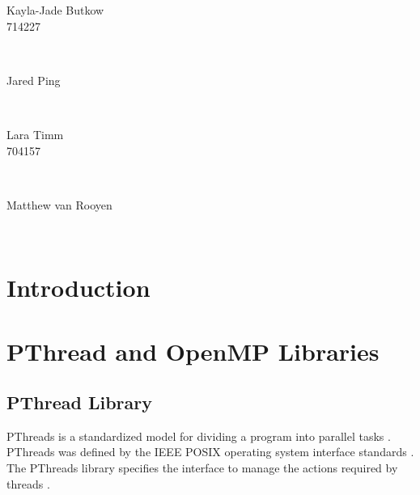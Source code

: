 \documentclass[10pt,twocolumn]{witseiepaper}
\begin{document}
\begin{titlepage}
\begin{minipage}{0.4\textwidth}
	\begin{flushleft} \large
		Kayla-Jade Butkow \\ 714227 %
	\end{flushleft}
\end{minipage}
~
\begin{minipage}{0.4\textwidth}
	\begin{flushright} \large
		Jared Ping \\
	\end{flushright}
\end{minipage}\\[1cm]

\begin{minipage}{0.4\textwidth}
	\begin{flushleft} \large
		Lara Timm \\ 704157
	\end{flushleft}
\end{minipage}
~
\begin{minipage}{0.4\textwidth}
	\begin{flushright} \large
		Matthew van Rooyen \\ 
	\end{flushright}
\end{minipage}\\[1cm]
		
\end{titlepage}


\thispagestyle{empty}
\pagestyle{plain}
\setcounter{page}{1}

\section{Introduction}


\section{PThread and OpenMP Libraries}

\subsection{PThread Library}
PThreads is a standardized model for dividing a program into parallel tasks \cite{pthreads}. PThreads was defined by the IEEE POSIX operating system interface standards \cite{pthreads}. The PThreads library specifies the interface to manage the actions required by threads \cite{pthreadVSopen}.
\end{document}
